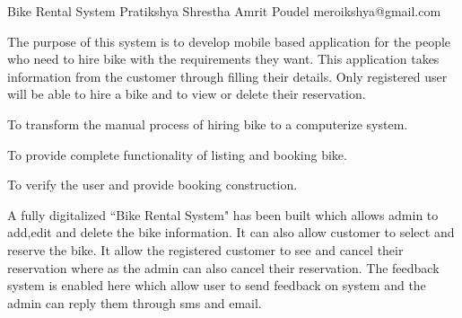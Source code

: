 \begin{conf-abstract}[]
 {Bike Rental System}
 {Pratikshya Shrestha 
 	 Amrit Poudel
 }
{meroikshya@gmail.com}

The purpose of this system is to develop mobile based application for the people who need to hire bike with the requirements they want.
This application takes information from the customer through filling their details.
Only registered user will be able to hire a bike and to view or delete their reservation.

To transform the manual process of hiring bike to a computerize system.

To provide complete functionality of listing and booking bike.

To verify the user and provide booking construction.


A fully digitalized ``Bike Rental System" has been built which allows admin to add,edit and delete the bike information. 
It can also allow customer to select and reserve the bike. 
It allow the registered customer to see and cancel their reservation where as the admin can also cancel  their reservation.
The feedback system is enabled here which allow user to send feedback on system and the admin can reply them through sms and email.


 \end{conf-abstract}
